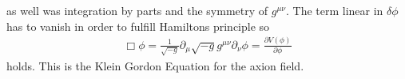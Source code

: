 \documentclass[a4paper, 12pt]{article}
\begin{document}
as well was integration by parts %
and the symmetry of $g^{\mu \nu}$. %
The term linear in $\delta \phi$ has to vanish in order to fulfill Hamiltons principle so
\begin{align}
    \label{eq:klein_gordon}
    \Box \phi = \frac{1}{\sqrt{-g}} \partial_\mu \sqrt{-g} g^{\mu \nu} \partial_\nu \phi = \frac{\partial V(\phi)}{\partial \phi}
\end{align}
holds.
This is the Klein Gordon Equation for the axion field. \cite[Chap. 4.1, Page 26]{MarshAxionCosmo}
\end{document}
